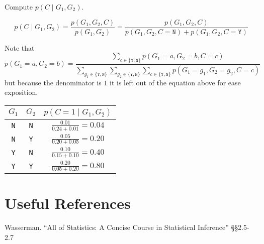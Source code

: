 Compute $p(C\mid G_1,G_2)$.

\[
p(C\mid G_1,G_2) = \frac{p(G_1,G_2,C)}{p(G_1,G_2)} =  \frac{p(G_1,G_2,C)}{p(G_1,G_2,C=\texttt{N})+p(G_1,G_2,C=\texttt{Y})} 
\]

Note that \[p(G_1=a,G_2=b) = \frac{\sum_{c\in\{\texttt{Y},\texttt{N}\}}p(G_1=a,G_2=b,C=c)}{\sum_{g_1\in\{\texttt{Y},\texttt{N}\}}\sum_{g_2\in\{\texttt{Y},\texttt{N}\}}\sum_{c\in\{\texttt{Y},\texttt{N}\}}p(G_1=g_1,G_2=g_2,C=c)}\]
but because the denominator is $1$ it is left out of the equation above for ease exposition. 

\begin{center}
\begin{tabular}{c|c|c}
$G_1$ & $G_2$ & $p(C=1\mid G_1,G_2)$\\
\hline\hline
\texttt{N}& \texttt{N}& $\frac{0.01}{0.24+0.01} = 0.04$\\
\texttt{N}& \texttt{Y}& $\frac{0.05}{0.20+0.05} = 0.20$\\
\texttt{Y}& \texttt{N}& $\frac{0.10}{0.15+0.10} = 0.40$\\
\texttt{Y}& \texttt{Y}& $\frac{0.20}{0.05+0.20} = 0.80$\\
\end{tabular}
\end{center}


\section*{Useful References}
Wasserman. ``All of Statistics: A Concise Course in Statistical Inference'' \S\S 2.5-2.7

